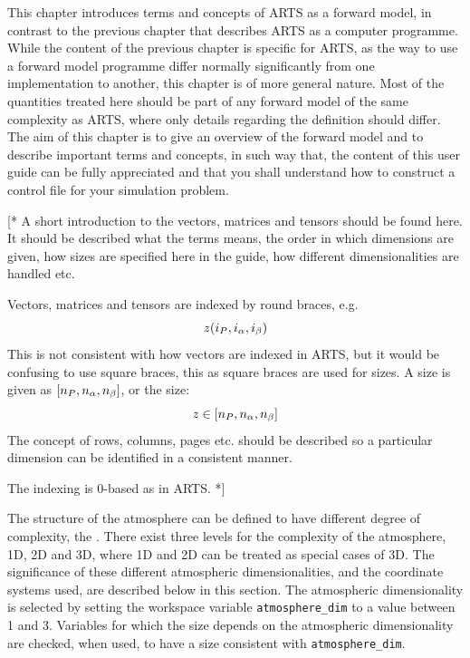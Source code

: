 This chapter introduces terms and concepts of ARTS as a forward model,
in contrast to the previous chapter that describes ARTS as a computer
programme. While the content of the previous chapter is specific for
ARTS, as the way to use a forward model programme differ normally
significantly from one implementation to another, this chapter is of
more general nature. Most of the quantities treated here should be
part of any forward model of the same complexity as ARTS, where only
details regarding the definition should differ. The aim of this
chapter is to give an overview of the forward model and to describe
important terms and concepts, in such way that, the content of this user
guide can be fully appreciated and that you shall understand how to
construct a control file for your simulation problem.



\label{sec:fm_defs:math}

[* A short introduction to the vectors, matrices and tensors should be
found here. It should be described what the terms means, the order in
which dimensions are given, how sizes are specified here in the guide,
how different dimensionalities are handled etc. 

Vectors, matrices and tensors are indexed by round braces, e.g.
\begin{equation}
  z(i_{P},i_{\alpha},i_{\beta})
\end{equation}
This is not consistent with how vectors are indexed in ARTS, but it
would be confusing to use square braces, this as square braces are
used for sizes. A size is given as $
[n_{P},n_{\alpha},n_{\beta}]$, or the size:
\begin{equation}
  z \in [n_{P},n_{\alpha},n_{\beta}]
\end{equation}
The concept of rows, columns, pages etc. should be described so a
particular dimension can be identified in a consistent manner.

The indexing is 0-based as in ARTS. *]



\label{sec:fm_defs:atmosphere}


\label{sec:fm_defs:atmdim}

The structure of the atmosphere can be defined to have different
degree of complexity, the . There
exist three levels for the complexity of the atmosphere, 1D, 2D and
3D, where 1D and 2D can be treated as special cases of 3D. The
significance of these different atmospheric dimensionalities, and the
coordinate systems used, are described below in this section. The
atmospheric dimensionality is selected by setting the workspace
variable \verb|atmosphere_dim| to a value between 1 and 3. Variables
for which the size depends on the atmospheric dimensionality are
checked, when used, to have a size consistent with
\verb|atmosphere_dim|.

